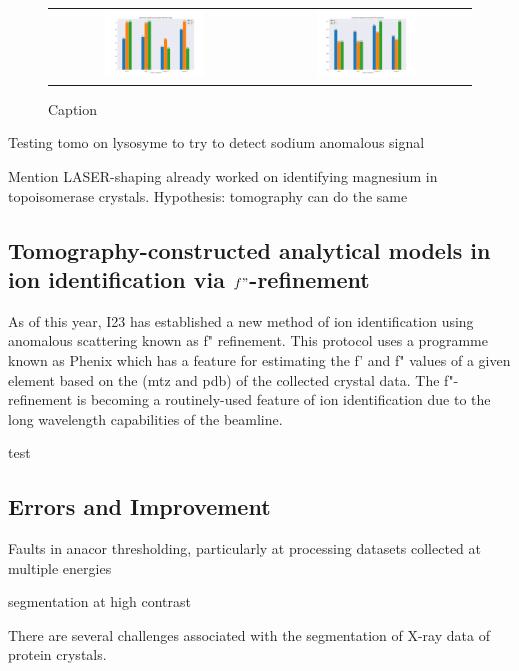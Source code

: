 \begin{figure}[h]
    \centering
    \begin{tabular}{cc}
    \includegraphics[width = 0.5\textwidth]{plots/Experiment 2 LS/ins_I_over_sigma.png} & \includegraphics[width = 0.5\textwidth]{plots/Experiment 2 LS/ins_rmerges.png}
    \end{tabular}
    \caption{Caption}
    \label{fig:insulin}
\end{figure}


Testing tomo on lysosyme to try to detect sodium anomalous signal

Mention LASER-shaping already worked on identifying magnesium in topoisomerase crystals. Hypothesis: tomography can do the same

\subsection{Tomography-constructed analytical models in ion identification via $f"$-refinement}

As of this year, I23 has established a new method of ion identification using anomalous scattering known as f" refinement. This protocol uses a programme known as Phenix which has a feature for estimating the f' and f" values of a given element based on the (mtz and pdb) of the collected crystal data. The f"-refinement is becoming a routinely-used feature of ion identification due to the long wavelength capabilities of the beamline. 

test

\subsection{Errors and Improvement}

Faults in anacor thresholding, particularly at processing datasets collected at multiple energies

segmentation at high contrast

There are several challenges associated with the segmentation of X-ray data of protein crystals.